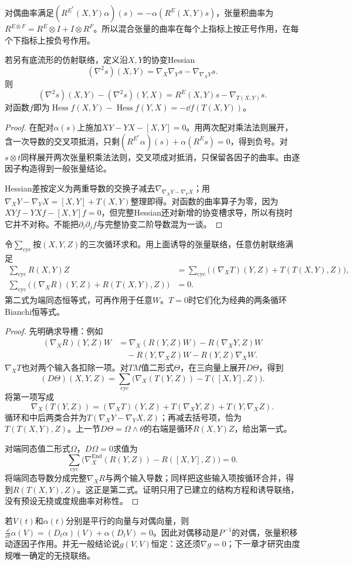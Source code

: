 \begin{proposition}[诱导曲率与二阶导数]\label{prop:ricci-commutator}
对偶曲率满足$(R^{E^*}(X,Y)\alpha)(s)=-\alpha(R^E(X,Y)s)$，张量积曲率为$R^{E\otimes F}=R^E\otimes I+I\otimes R^F$。所以混合张量的曲率在每个上指标上按正号作用，在每个下指标上按负号作用。

若另有底流形的仿射联络，定义沿$X,Y$的协变Hessian
\[
 (\nabla^2s)(X,Y)=\nabla_X\nabla_Ys-\nabla_{\nabla_XY}s.
\]
则
\[
 (\nabla^2s)(X,Y)-(\nabla^2s)(Y,X)
 =R^E(X,Y)s-\nabla_{T(X,Y)}s.
\]
对函数$f$即为$\operatorname{Hess}f(X,Y)-\operatorname{Hess}f(Y,X)=-\dd f(T(X,Y))$。
\end{proposition}
\begin{proof}
在配对$\alpha(s)$上施加$XY-YX-[X,Y]=0$。用两次配对乘法法则展开，含一次导数的交叉项抵消，只剩$(R^{E^*}\alpha)(s)+\alpha(R^Es)=0$，得到负号。对$s\otimes t$同样展开两次张量积乘法法则，交叉项成对抵消，只保留各因子的曲率。由逐因子构造得到一般张量结论。

Hessian差按定义为两重导数的交换子减去$\nabla_{\nabla_XY-\nabla_YX}$；用$\nabla_XY-\nabla_YX=[X,Y]+T(X,Y)$整理即得。对函数的曲率算子为零，因为$XYf-YXf-[X,Y]f=0$，但完整Hessian还对新增的协变槽求导，所以有挠时它并不对称。不能把$\partial_i\partial_jf$与完整协变二阶导数混为一谈。
\end{proof}

\begin{theorem}[含挠率的张量形式Bianchi恒等式]\label{thm:bianchi-tensors}
令$\sum_{\mathrm{cyc}}$按$(X,Y,Z)$的三次循环求和。用上面诱导的张量联络，任意仿射联络满足
\begin{align*}
 \sum_{\mathrm{cyc}}R(X,Y)Z
 &=\sum_{\mathrm{cyc}}\bigl((\nabla_XT)(Y,Z)+T(T(X,Y),Z)\bigr),\\
 \sum_{\mathrm{cyc}}\bigl((\nabla_XR)(Y,Z)+R(T(X,Y),Z)\bigr)&=0.
\end{align*}
第二式为端同态恒等式，可再作用于任意$W$。$T=0$时它们化为经典的两条循环Bianchi恒等式。
\end{theorem}
\begin{proof}
先明确求导槽：例如
\begin{align*}
 (\nabla_XR)(Y,Z)W
 &=\nabla_X(R(Y,Z)W)-R(\nabla_XY,Z)W\\
 &\quad-R(Y,\nabla_XZ)W-R(Y,Z)\nabla_XW.
\end{align*}
$\nabla_XT$也对两个输入各扣除一项。对$TM$值二形式$\Theta$，在三向量上展开$D\Theta$，得到
\[
 (D\Theta)(X,Y,Z)=\sum_{\mathrm{cyc}}
 \bigl(\nabla_X(T(Y,Z))-T([X,Y],Z)\bigr).
\]
将第一项写成
\[
 \nabla_X(T(Y,Z))=(\nabla_XT)(Y,Z)+T(\nabla_XY,Z)+T(Y,\nabla_XZ).
\]
循环和中后两类合并为$T(\nabla_XY-\nabla_YX,Z)$；再减去括号项，恰为$T(T(X,Y),Z)$。上一节$D\Theta=\Omega\wedge\theta$的右端是循环$R(X,Y)Z$，给出第一式。

对端同态值二形式$\Omega$，$D\Omega=0$求值为
\[
 \sum_{\mathrm{cyc}}\bigl(\nabla_X^{\operatorname{End}}(R(Y,Z))-R([X,Y],Z)\bigr)=0.
\]
将端同态导数分成完整$\nabla_XR$与两个输入导数；同样把这些输入项按循环合并，得到$R(T(X,Y),Z)$。这正是第二式。证明只用了已建立的结构方程和诱导联络，没有预设无挠或度规曲率对称性。
\end{proof}

\begin{example}[平行移动与张量运算相容]
若$V(t)$和$\alpha(t)$分别是平行的向量与对偶向量，则$\frac{\dd}{\dd t}\alpha(V)=(D_t\alpha)(V)+\alpha(D_tV)=0$。因此对偶移动是$P^{-1}$的对偶，张量积移动逐因子作用。并无一般结论说$g(V,V)$恒定：这还须$\nabla g=0$；下一章才研究由度规唯一确定的无挠联络。
\end{example}
